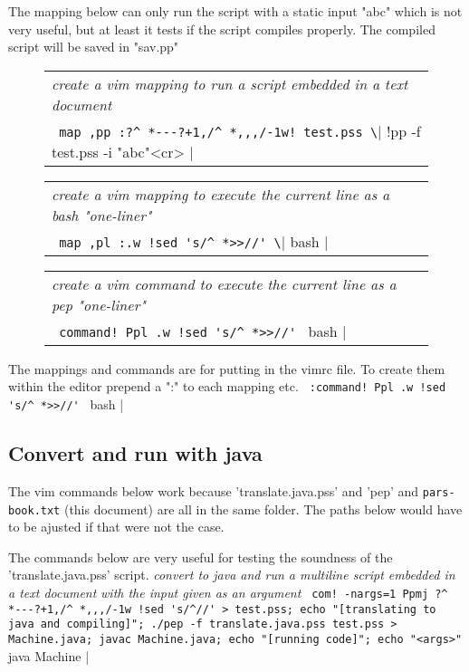 \documentclass[a4paper,12pt]{article}
\begin{document}
  The mapping below can only run the script with a static input "abc"
  which is not very useful, but at least it tests if the script compiles
  properly. The compiled script will be saved in "sav.pp"
 \begin{figure}
 \begin{tabular}{ l }
 \emph{ create a vim mapping to run a script embedded in a text document } \\ 
 \verb| map ,pp :?^ *---?+1,/^ *,,,/-1w! test.pss \| !pp -f test.pss -i "abc"<cr> |
 \end{tabular} 
 \end{figure}
 \begin{figure}
 \begin{tabular}{ l }
 \emph{ create a vim mapping to execute the current line as a bash "one-liner" } \\ 
 \verb| map ,pl :.w !sed 's/^ *>>//' \| bash |
 \end{tabular} 
 \end{figure}
 \begin{figure}
 \begin{tabular}{ l }
 \emph{ create a vim command to execute the current line as a pep "one-liner" } \\ 
 \verb| command! Ppl .w !sed 's/^ *>>//' | bash |
 \end{tabular} 
 \end{figure}

  The mappings and commands are for putting in the vimrc file. To
  create them within the editor prepend a ":" to each mapping etc. 
 \verb| :command! Ppl .w !sed 's/^ *>>//' | bash |


\subsection{Convert and run with java}

  The vim commands below work because 'translate.java.pss' and 'pep' and
  \texttt{pars-book.txt} (this document) are all in the same folder. The paths
  below would have to be ajusted if that were not the case.

  The commands below are very useful for testing the soundness of the
  'translate.java.pss' script.
 \emph{ convert to java and run a multiline script embedded in a text document }
 \emph{ with the input given as an argument  } 
 \verb| com! -nargs=1 Ppmj ?^ *---?+1,/^ *,,,/-1w !sed 's/^//' > test.pss; echo "[translating to java and compiling]"; ./pep -f translate.java.pss test.pss > Machine.java; javac Machine.java; echo "[running code]"; echo "<args>" | java Machine |
\end{document}
